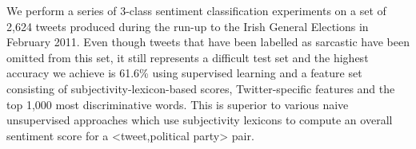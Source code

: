 We perform a series of 3-class sentiment classification experiments on a set of 2,624 tweets produced during the run-up to the Irish General Elections in
 February 2011. Even though tweets that have been labelled as sarcastic
 have been omitted from this set, it still represents a difficult test set and
 the highest accuracy we achieve is 61.6\% using supervised learning and a
 feature set consisting of subjectivity-lexicon-based scores, Twitter-specific
 features and the top 1,000 most discriminative words. This is superior to
 various naive unsupervised approaches which use subjectivity lexicons to
 compute an overall sentiment score for a <tweet,political party> pair.

